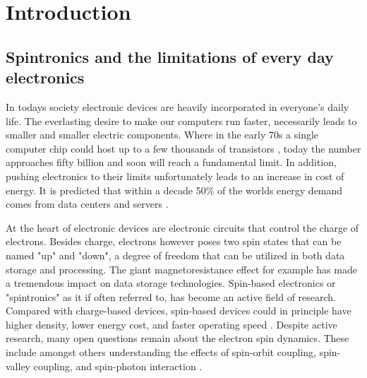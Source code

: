\chapter{Introduction}\label{ch:introduction}
\section{Spintronics and the limitations of every day electronics}
In todays society electronic devices are heavily incorporated in everyone's daily life. The everlasting desire to make our computers run faster, necessarily leads to smaller and smaller electric components. Where in the early 70s a single computer chip could host up to a few thousands of transistors \cite{?}, today the number approaches fifty billion \cite{?} and soon will reach a fundamental limit. In addition, pushing electronics to their limits unfortunately leads to an increase in cost of energy. It is predicted that within a decade 50\% of the worlds energy demand comes from data centers and servers \cite{?}.

At the heart of electronic devices are electronic circuits that control the charge of electrons. Besides charge, electrons however poses two spin states that can be named "up" and "down", a degree of freedom that can be utilized in both data storage and processing. The giant magnetoresistance effect \cite{?} for example has made a tremendous impact on data storage technologies. Spin-based electronics or "spintronics" as it if often referred to, has become an active field of research. Compared with charge-based devices, spin-based devices could in principle have higher density, lower energy cost, and faster operating speed \cite{pu_chapter_2020, liu_chapter_2020, book_recent_advancements}. Despite active research, many open questions remain about the electron spin dynamics. These include amongst others understanding the effects of spin-orbit coupling, spin-valley coupling, and spin-photon interaction \cite{liu_chapter_2020}. 





